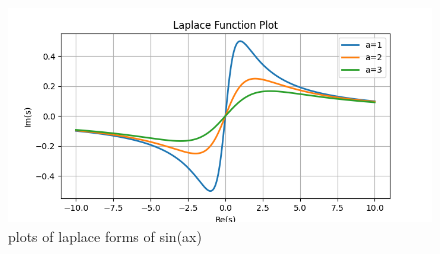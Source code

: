 \documentclass[journal,12pt,twocolumn]{IEEEtran}
\begin{document}
\begin{figure}[ht]
    \centering
    \includegraphics[width=\columnwidth]{figs/Figure_2.png}
    \caption{plots of laplace forms of sin(ax)}
    \label{fig:fig2_2022_es_13_054}
\end{figure}
\end{document}
